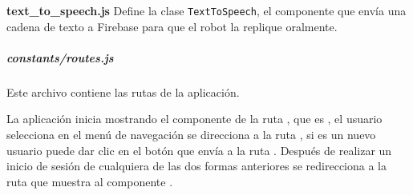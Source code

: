 \textbf{text\_to\_speech.js}
\label{\detokenize{code_docs:text-to-speech-js}}
Define la clase \texttt{TextToSpeech}, el componente que envía una cadena de texto a Firebase para que el robot la
replique oralmente.

\subparagraph{constants/routes.js}
\label{\detokenize{code_docs:constants}}

Este archivo contiene las rutas de la aplicación.

%
\begin{sphinxVerbatim}[commandchars=\\\{\}]
    
    
    
    
\end{sphinxVerbatim}


La aplicación inicia mostrando el componente de la ruta , que es
, el usuario selecciona  en el menú de navegación
se direcciona a la ruta , si es un nuevo usuario puede dar clic
en el botón que envía a la ruta . Después de realizar un inicio de
sesión de cualquiera de las dos formas anteriores se redirecciona a la ruta
 que muestra al componente .

